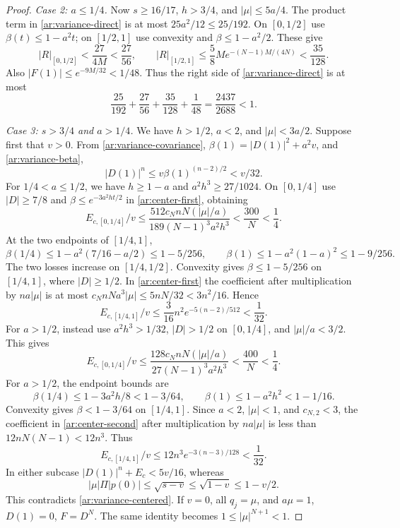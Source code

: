 \begin{proof}
\smallskip
\noindent\emph{Case 2: $a\le1/4$.}
Now $s\ge16/17$, $h>3/4$, and $|\mu|\le5a/4$.
The product term in \eqref{ar:variance-direct} is at most
$25a^2/12\le25/192$. On $[0,1/2]$ use
$\beta(t)\le1-a^2t$; on $[1/2,1]$ use convexity and
$\beta\le1-a^2/2$. These give
\[
 |R|_{[0,1/2]}<\frac{27}{4M}<\frac{27}{56},
 \qquad
 |R|_{[1/2,1]}\le\frac58M e^{-(N-1)M/(4N)}<\frac{35}{128}.
\]
Also $|F(1)|\le e^{-9M/32}<1/48$. Thus the right side of
\eqref{ar:variance-direct} is at most
\[
 \frac{25}{192}+\frac{27}{56}+\frac{35}{128}+\frac1{48}
 =\frac{2437}{2688}<1.
\]

\smallskip
\noindent\emph{Case 3: $s>3/4$ and $a>1/4$.}
We have $h>1/2$, $a<2$, and $|\mu|<3a/2$.
Suppose first that $v>0$. From
\eqref{ar:variance-covariance}, $\beta(1)=|D(1)|^2+a^2v$, and
\eqref{ar:variance-beta},
\[
 |D(1)|^n\le v\beta(1)^{(n-2)/2}<v/32.
\]
For $1/4<a\le1/2$, we have $h\ge1-a$ and
$a^2h^3\ge27/1024$. On $[0,1/4]$ use
$|D|\ge7/8$ and $\beta\le e^{-3a^2ht/2}$ in
\eqref{ar:center-first}, obtaining
\[
 E_{c,[0,1/4]}/v
 \le\frac{512c_NnN(|\mu|/a)}{189(N-1)^3a^2h^3}
 <\frac{300}{N}<\frac14.
\]
At the two endpoints of $[1/4,1]$,
\[
 \beta(1/4)\le1-a^2(7/16-a/2)\le1-5/256,
 \qquad
 \beta(1)\le1-a^2(1-a)^2\le1-9/256.
\]
The two losses increase on $[1/4,1/2]$. Convexity gives
$\beta\le1-5/256$ on $[1/4,1]$, where $|D|\ge1/2$.
In \eqref{ar:center-first} the coefficient after multiplication by
$na|\mu|$ is at most
$c_NnNa^3|\mu|\le5nN/32<3n^2/16$. Hence
\[
 E_{c,[1/4,1]}/v\le\frac3{16}n^2e^{-5(n-2)/512}<\frac1{32}.
\]
For $a>1/2$, instead use $a^2h^3>1/32$, $|D|>1/2$ on
$[0,1/4]$, and $|\mu|/a<3/2$. This gives
\[
 E_{c,[0,1/4]}/v
 \le\frac{128c_NnN(|\mu|/a)}{27(N-1)^3a^2h^3}
 <\frac{400}{N}<\frac14.
\]
For $a>1/2$, the endpoint bounds are
\[
 \beta(1/4)\le1-3a^2h/8<1-3/64,\qquad
 \beta(1)\le1-a^2h^2<1-1/16.
\]
Convexity gives $\beta<1-3/64$ on $[1/4,1]$.
Since $a<2$, $|\mu|<1$, and $c_{N,2}<3$, the coefficient in
\eqref{ar:center-second} after multiplication by $na|\mu|$ is
less than $12nN(N-1)<12n^3$. Thus
\[
 E_{c,[1/4,1]}/v\le12n^3e^{-3(n-3)/128}<\frac1{32}.
\]
In either subcase $|D(1)|^n+E_c<5v/16$, whereas
\[
 |\mu|\Pi|p(0)|\le\sqrt{s-v}\le\sqrt{1-v}\le1-v/2.
\]
This contradicts \eqref{ar:variance-centered}.
If $v=0$, all $q_j=\mu$, and $a\mu=1$, $D(1)=0$, $F=D^N$.
The same identity becomes $1\le|\mu|^{N+1}<1$.


\end{proof}
